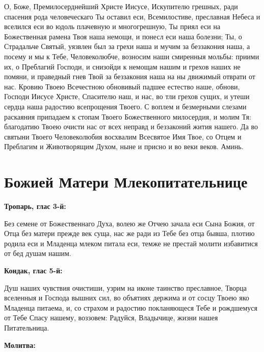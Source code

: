 О, Боже, Премилосерднейший Христе Иисусе, Искупителю грешных, ради спасения рода человеческаго Ты оставил еси, Всемилостиве, преславная Небеса и вселился еси во юдоль плачевную и многогрешную, Ты приял еси на Божественная рамена Твоя наша немощи, и понесл еси наша болезни; Ты, о Страдальче Святый, уязвлен был за грехи наша и мучим за беззакония наша, а посему и мы к Тебе, Человеколюбче, возносим наши смиренныя мольбы: приими их, о Преблагий Господи, и снизойди к немощам нашим и грехов наших не помяни, и праведный гнев Твой за беззакония наша на ны движимый отврати от нас. Кровию Твоею Всечестною обновивый падшее естество наше, обнови, Господи Иисусе Христе, Спасителю наш, и нас, во тли грехов сущих, и утеши сердца наша радостию всепрощения Твоего. С воплем и безмерными слезами раскаяния припадаем к стопам Твоего Божественного милосердия, и молим Тя: благодатию Твоею очисти нас от всех неправд и беззаконий жития нашего. Да во святыни Твоего Человеколюбия восхвалим Всесвятое Имя Твое, со Отцем и Преблагим и Животворящим Духом, ныне и присно и во веки веков. Аминь.

\bigskip\bigskip\mychapterending


 

\section{Божией Матери Млекопитательнице}
 
\bfseries Тропарь, глас 3-й:\normalfont{}


Без семене от Божественнаго Духа, волею же Отчею зачала еси Сына Божия, от Отца без матери прежде век суща, нас же ради из Тебе без отца бывша, плотию родила еси и Младенца млеком питала еси, темже не престай молити избавитися от бед душам нашим.


\medskip
\bfseries Кондак, глас 5-й:\normalfont{}


Душ наших чувствия очистиши, узрим на иконе таинство преславное, Творца вселенныя и Господа вышних сил, во объятиях держима и от сосцу Твоею яко Младенца питаема, и, со страхом и радостию покланяющеся Тебе и рождшемуся от Тебе Спасу нашему, воззовем: Радуйся, Владычице, жизни нашея Питательница.


\medskip
\bfseries Молитва:\normalfont{}


